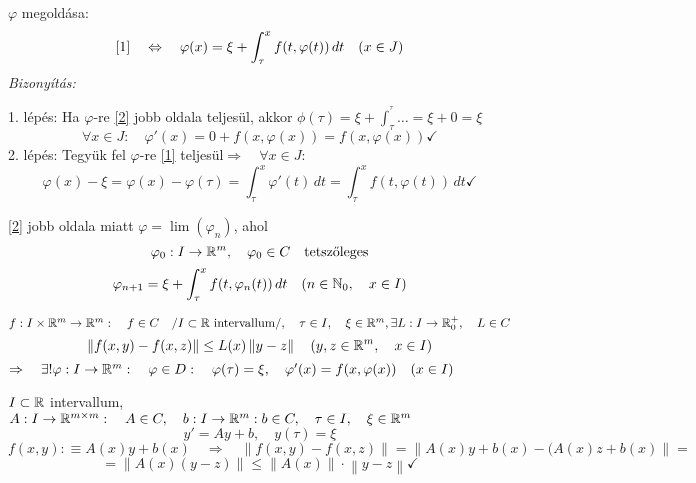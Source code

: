 \documentclass[a4paper,11.5pt]{article}
\newcommand{\norm}[1]{\left\lVert#1\right\rVert}
\begin{document}
	\begin{theorem}
		$\varphi$ megoldása:
		\begin{gather}\label{2}
		\ref{1}\quad \Leftrightarrow\quad \varphi(x)=\xi+\int_{\tau}^{x}f(t,\varphi(t))\,dt\quad (x\in J)
		\end{gather}
		\textit{Bizonyítás:}
		
		1. lépés: Ha $\varphi$-re \ref{2} jobb oldala teljesül, akkor $\phi(\tau)=\xi+\int_{\tau}^{^\tau}\ldots=\xi+0=\xi$
		\[ \forall x\in J:\quad \varphi'(x)=0+f(x,\varphi(x))=f(x,\varphi(x))\checkmark \]
		2. lépés: Tegyük fel $\varphi$-re \ref{1} teljesül\quad $\Rightarrow\quad \forall x\in J$:
		\[ \varphi(x)-\xi=\varphi(x)-\varphi(\tau)=\int_{\tau}^{x}\varphi'(t)\,dt=\int_{\tau}^{x}f(t,\varphi(t))\,dt\checkmark \]
	\end{theorem}
	\begin{note}
		\ref{2} jobb oldala miatt $\varphi=\lim(\varphi_n)$, ahol
		\[ \varphi_0:I\to\mathbb{R}^m,\quad \varphi_0\in C\quad \text{tetszőleges} \]
		\[ \varphi_{n+1}=\xi+\int_{\tau}^{x}f(t,\varphi_n(t))\,dt\quad (n\in\mathbb{N}_0,\quad x\in I) \]
	\end{note}
	\begin{theorem}
		$f:I\times\mathbb{R}^m\to\mathbb{R}^m:\quad f\in C\quad /I\subset\mathbb{R} \text{ intervallum}/,\quad \tau\in I, \quad \xi\in\mathbb{R}^m,\exists L:I\to\mathbb{R}^+_0,\quad L\in C$
		\[ \norm{f(x,y)-f(x,z)}\leq L(x)\norm{y-z}\quad (y,z\in\R^m,\quad x\in I) \]
		$\Rightarrow \quad \exists!\varphi:I\to\mathbb{R}^m:\quad \varphi\in D:\quad \varphi(\tau)=\xi,\quad \varphi'(x)=f(x,\varphi(x))\quad (x\in I)$
	\end{theorem}
	\begin{example}
		$I\subset\mathbb{R}$ intervallum, $A:I\to\mathbb{R}^{m\times m}:\quad A\in C,\quad b:I\to\mathbb{R}^m:b\in C, \quad \tau\in I,\quad \xi\in\mathbb{R}^m$
		\[ y'=Ay+b,\quad y(\tau)=\xi \]
		\[ f(x,y):\equiv A(x)y+b(x)\quad \Rightarrow\quad \norm{f(x,y)-f(x,z)}=\norm{A(x)y+b(x)-(A(x)z+b(x)}=\]
		\[=\norm{A(x)(y-z)}\leq\norm{A(x)}\cdot\norm{y-z}\checkmark \]
	\end{example}
\end{document}
